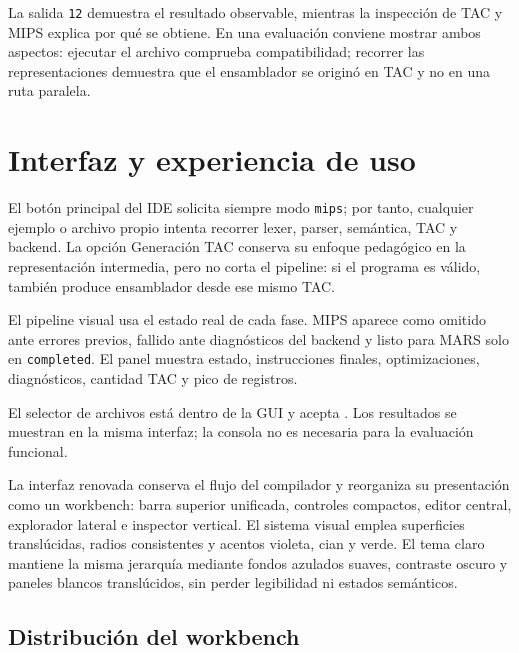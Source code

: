 \documentclass[11pt,letterpaper,oneside]{report}
\newcommand{\codigo}[1]{\texttt{#1}}
\newcommand{\archivo}[1]{\path{#1}}
\begin{document}
La salida \codigo{12} demuestra el resultado observable, mientras la inspecci\'on de TAC y MIPS explica por qu\'e se obtiene. En una evaluaci\'on conviene mostrar ambos aspectos: ejecutar el archivo comprueba compatibilidad; recorrer las representaciones demuestra que el ensamblador se origin\'o en TAC y no en una ruta paralela.

\chapter{Interfaz y experiencia de uso}

El bot\'on principal del IDE solicita siempre modo \codigo{mips}; por tanto, cualquier ejemplo o archivo propio intenta recorrer lexer, parser, sem\'antica, TAC y backend. La opci\'on Generaci\'on TAC conserva su enfoque pedag\'ogico en la representaci\'on intermedia, pero no corta el pipeline: si el programa es v\'alido, tambi\'en produce ensamblador desde ese mismo TAC.

El pipeline visual usa el estado real de cada fase. MIPS aparece como omitido ante errores previos, fallido ante diagn\'osticos del backend y listo para MARS solo en \codigo{completed}. El panel muestra estado, instrucciones finales, optimizaciones, diagn\'osticos, cantidad TAC y pico de registros.

El selector de archivos est\'a dentro de la GUI y acepta \archivo{.cps}. Los resultados se muestran en la misma interfaz; la consola no es necesaria para la evaluaci\'on funcional.

La interfaz renovada conserva el flujo del compilador y reorganiza su presentaci\'on como un workbench: barra superior unificada, controles compactos, editor central, explorador lateral e inspector vertical. El sistema visual emplea superficies transl\'ucidas, radios consistentes y acentos violeta, cian y verde. El tema claro mantiene la misma jerarqu\'ia mediante fondos azulados suaves, contraste oscuro y paneles blancos transl\'ucidos, sin perder legibilidad ni estados sem\'anticos.

\section{Distribuci\'on del workbench}
\end{document}
